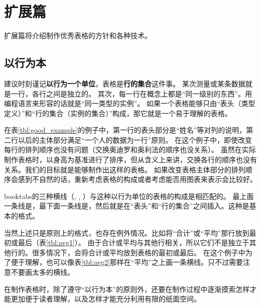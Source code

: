\documentclass{article}
\newcommand{\Tref}[1]{表\ref{#1}}
\begin{document}
\section{扩展篇}
扩展篇将介绍制作优秀表格的方针和各种技术。

\subsection{以行为本}
建议时刻谨记\textbf{以行为一个单位}，表格是\textbf{行的集合}这件事。
某次测量或某条数据就是一行，各行之间是独立的。
其次，每一行在概念上都是“同一级别的东西”。用编程语言来形容的话就是“同一类型的实例”。
如果一个表格能够只由“表头（类型定义）”和“行的集合（实例的集合）”构成，那它就是一个易于理解的表格。

在\Tref{tbl:good_example}的例子中，第一行的表头部分是“姓名”等对列的说明，第二行以后的主体部分满足“一个人的数据为一行”原则。
在这个例子中，即使改变每行的排列顺序也没有问题（交换奥迪罗和奥利法的顺序也没关系）。
虽然在实际制作表格时，以身高为基准进行了排序，但从含义上来讲，交换各行的顺序也没有关系。我们的目标就是能够制作出这样的表格。
如果改变表格主体部分的排列顺序会感到不自然的话，重新考虑表格的构成或者考虑能否用图表来表示会比较好。

booktabs的三种横线（\texttt{\toprule}, \texttt{\midrule}, \texttt{\bottomrule}）与这种以行为单位的表格的构成是相匹配的。
最上面一条线是\texttt{\toprule}，最下面一条线是\texttt{\bottomrule}，然后就是在“表头”和“行的集合”之间插入\texttt{\midrule}。这种是基本的格式。

当然上述只是原则上的格式，也存在例外情况。比如将“合计”或“平均”那行放到最初或最后（\Tref{tbl:avg1}）。
由于合计或平均与其他行相关，所以它们不是独立于其他行的。很多情况下，会将合计或平均放到表格的最初或最后。
在这个例子中为了便于理解，也可以像\Tref{tbl:avg2}那样在“平均”之上画一条横线。只不过需要注意不要画太多的横线。

在制作表格时，除了遵守“以行为本”的原则外，还要在制作过程中逐渐摸索怎样才能更加便于读者理解，以及怎样才能充分利用有限的纸面空间。
\end{document}
